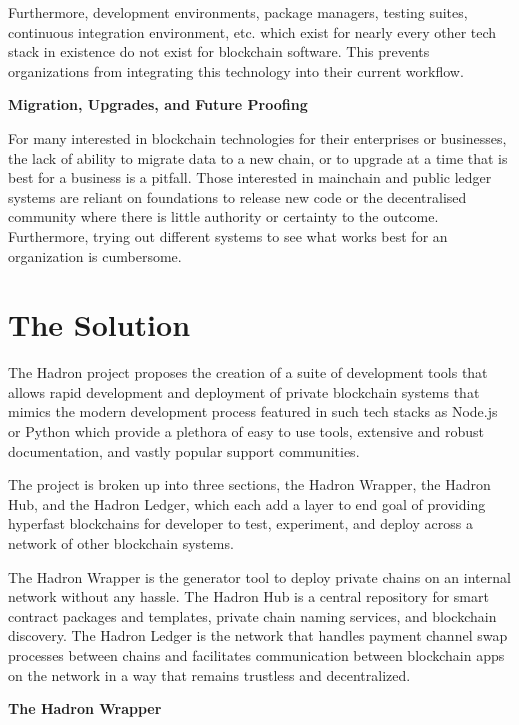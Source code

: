 \documentclass{%
	article}
\begin{document}
Furthermore, development environments, package managers, testing suites, continuous integration environment, etc. which exist for nearly every other tech stack in existence do not exist for blockchain software. This prevents organizations from integrating this technology into their current workflow.

\begin{center}
\textbf{Migration, Upgrades, and Future Proofing}
\end{center}

For many interested in blockchain technologies for their enterprises or businesses, the lack of ability to migrate data to a new chain, or to upgrade at a time that is best for a business is a pitfall. Those interested in mainchain and public ledger systems are reliant on foundations to release new code or the decentralised community where there is little authority or certainty to the outcome. Furthermore, trying out different systems to see what works best for an organization is cumbersome.

\section{The Solution}

The Hadron project proposes the creation of a suite of development tools that allows rapid development and deployment of private blockchain systems that mimics the modern development process featured in such tech stacks as Node.js or Python which provide a plethora of easy to use tools, extensive and robust documentation, and vastly popular support communities.

The project is broken up into three sections, the Hadron Wrapper, the Hadron Hub, and the Hadron Ledger, which each add a layer to end goal of providing hyperfast blockchains for developer to test, experiment, and deploy across a network of other blockchain systems.

The Hadron Wrapper is the generator tool to deploy private chains on an internal network without any hassle. The Hadron Hub is a central repository for smart contract packages and templates, private chain naming services, and blockchain discovery. The Hadron Ledger is the network that handles payment channel swap processes between chains and facilitates communication between blockchain apps on the network in a way that remains trustless and decentralized.

\begin{center}
\textbf{The Hadron Wrapper}
\end{center}
\end{document}
